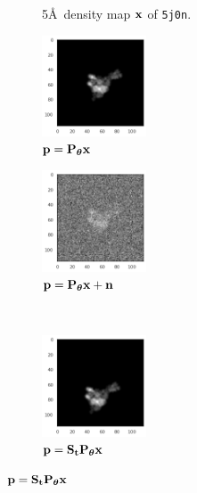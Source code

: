 \begin{figure}[ht!]
\begin{minipage}[b]{0.50\linewidth}
\begin{subfigure}[b]{0.49\linewidth}
            \caption{5\AA\ density map $\mathbf{x}$ of \texttt{5j0n}.}
        \end{subfigure}
        \caption{%
            Two proteins with different symmetries.
        }\label{fig:pdb-proteins}
    \end{minipage}
    \hfill
    \begin{minipage}[b]{0.45\linewidth}
        \centering
        \begin{subfigure}[b]{0.49\linewidth}
            \centering
            \includegraphics[height=3cm]{figures/5j0n_noise0}
            \caption{$\mathbf{p} = \mathbf{P}_{{\boldsymbol{\theta}}} \mathbf{x}$}
        \end{subfigure}
        \hfill
        \begin{subfigure}[b]{0.49\linewidth}
            \centering
            \includegraphics[height=3cm]{figures/5j0n_noise16}
            \caption{$\mathbf{p} = \mathbf{P}_{{\boldsymbol{\theta}}} \mathbf{x} + \mathbf{n}$}
        \end{subfigure}
        \\ \vspace{0.5em}
        \begin{subfigure}[b]{0.49\linewidth}
            \centering
            \includegraphics[height=3cm]{figures/5j0n_translated}
            \caption{$\mathbf{p} = \mathbf{S}_{\mathbf{t}} \mathbf{P}_{{\boldsymbol{\theta}}} \mathbf{x}$}
        \end{subfigure}

\end{minipage}
\end{figure}

